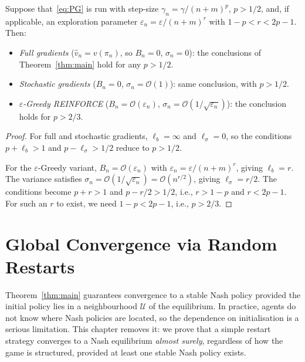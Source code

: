 \documentclass[a4paper,oneside,11pt]{report}
\newcommand{\calU}{\mathcal{U}}
\numberwithin{theorem}{chapter}
\numberwithin{equation}{chapter}
\begin{document}
\begin{corollary}
  \label{cor:models}
  Suppose that~\eqref{eq:PG} is run with step-size
  $\gamma_n = \gamma/(n+m)^p$, $p > 1/2$, and, if applicable, an
  exploration parameter $\varepsilon_n = \varepsilon/(n+m)^r$ with
  $1-p < r < 2p - 1$. Then:
  \begin{itemize}
  \item \emph{Full gradients} ($\hat v_n = v(\pi_n)$, so $B_n = 0$,
    $\sigma_n = 0$): the conclusions of Theorem~\ref{thm:main} hold for
    any $p > 1/2$.
  \item \emph{Stochastic gradients} ($B_n = 0$,
    $\sigma_n = \mathcal{O}(1)$): same conclusion, with
    $p > 1/2$.
  \item \emph{$\varepsilon$-Greedy REINFORCE}
    ($B_n = \mathcal{O}(\varepsilon_n)$,
    $\sigma_n = \mathcal{O}(1/\sqrt{\varepsilon_n})$): the conclusion
    holds for $p > 2/3$.
  \end{itemize}
\end{corollary}

\begin{proof}
  For full and stochastic gradients, $\ell_b = \infty$ and
  $\ell_\sigma = 0$, so the conditions $p + \ell_b > 1$ and
  $p - \ell_\sigma > 1/2$ reduce to $p > 1/2$.

  For the $\varepsilon$-Greedy variant, $B_n = \mathcal{O}(\varepsilon_n)$
  with $\varepsilon_n = \varepsilon/(n+m)^r$, giving $\ell_b = r$.
  The variance satisfies
  $\sigma_n = \mathcal{O}(1/\sqrt{\varepsilon_n})
  = \mathcal{O}(n^{r/2})$, giving $\ell_\sigma = r/2$. The conditions
  become $p + r > 1$ and $p - r/2 > 1/2$, i.e.,
  $r > 1 - p$ and $r < 2p - 1$. For such an $r$ to exist, we need
  $1 - p < 2p - 1$, i.e., $p > 2/3$.
\end{proof}


\chapter{Global Convergence via Random Restarts}
\label{ch:global}

Theorem~\ref{thm:main} guarantees convergence to a stable Nash policy
provided the initial policy lies in a neighbourhood $\calU$ of the
equilibrium. In practice, agents do not know where Nash policies are
located, so the dependence on initialisation is a serious limitation.
This chapter removes it: we prove that a simple restart strategy
converges to a Nash equilibrium \emph{almost surely}, regardless of
how the game is structured, provided at least one stable Nash policy
exists.
\end{document}
